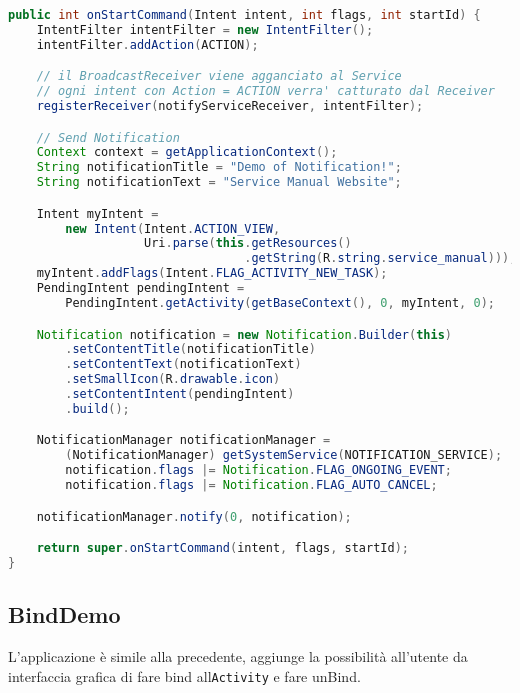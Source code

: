 \begin{lstlisting}[language=Java]
public int onStartCommand(Intent intent, int flags, int startId) {
	IntentFilter intentFilter = new IntentFilter();
	intentFilter.addAction(ACTION);

	// il BroadcastReceiver viene agganciato al Service
	// ogni intent con Action = ACTION verra' catturato dal Receiver
	registerReceiver(notifyServiceReceiver, intentFilter);

	// Send Notification
	Context context = getApplicationContext();
	String notificationTitle = "Demo of Notification!";
	String notificationText = "Service Manual Website";

	Intent myIntent = 
		new Intent(Intent.ACTION_VIEW, 
				   Uri.parse(this.getResources()
				   				 .getString(R.string.service_manual)));
	myIntent.addFlags(Intent.FLAG_ACTIVITY_NEW_TASK);
	PendingIntent pendingIntent = 
		PendingIntent.getActivity(getBaseContext(), 0, myIntent, 0);

	Notification notification = new Notification.Builder(this)
		.setContentTitle(notificationTitle)
		.setContentText(notificationText)
		.setSmallIcon(R.drawable.icon)
		.setContentIntent(pendingIntent)
		.build();

	NotificationManager notificationManager = 
		(NotificationManager) getSystemService(NOTIFICATION_SERVICE);
		notification.flags |= Notification.FLAG_ONGOING_EVENT;
		notification.flags |= Notification.FLAG_AUTO_CANCEL;

	notificationManager.notify(0, notification); 

	return super.onStartCommand(intent, flags, startId);
}
\end{lstlisting}


\subsection{BindDemo}
L'applicazione è simile alla precedente, aggiunge la possibilità all'utente da interfaccia grafica di fare bind all\lstinline|Activity| e fare unBind.


\undef{\Activity}
\undef{\Intent}
\undef{\View}
\undef{\ViewGroup}
\undef{\LinearLayout}
\undef{\RelativeLayout}
\undef{\ScrollView}
\undef{\ListView}
\undef{\SharedPreferences}
\undef{\ListFragment}
\undef{\MainActivity}
\undef{\AsyncTask}
\undef{\FrameLayout}
\undef{\WorkoutListFragment}
\undef{\Fragment}
\undef{\SQLiteDatabase}
\undef{\SQLiteOpenHelper}
\undef{\Cursor}
